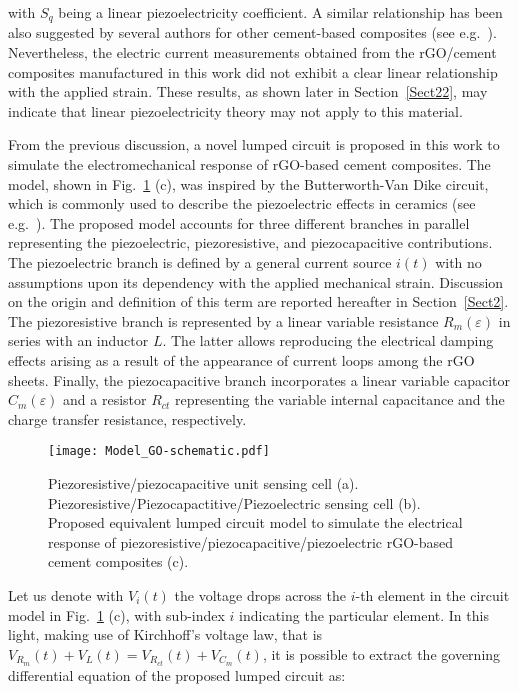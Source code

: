 \documentclass[a4paper,fleqn]{cas-sc}
\begin{document}
\noindent with $S_q$ being a linear piezoelectricity coefficient. A similar relationship has been also suggested by several authors for other cement-based composites (see e.g.~\cite{SHUAI2020108564}). Nevertheless, the electric current measurements obtained from the rGO/cement composites manufactured in this work did not exhibit a clear linear relationship with the applied strain. These results, as shown later in Section~\ref{Sect22}, may indicate that linear piezoelectricity theory may not apply to this material.

From the previous discussion, a novel lumped circuit is proposed in this work to simulate the electromechanical response of rGO-based cement composites. The model, shown in Fig.~\ref{lcm} (c), was inspired by the Butterworth-Van Dike circuit, which is commonly used to describe the piezoelectric effects in ceramics (see e.g.~\cite{Kim2008}). The proposed model accounts for three different branches in parallel representing the piezoelectric, piezoresistive, and piezocapacitive contributions. The piezoelectric branch is defined by a general current source $i(t)$ with no assumptions upon its dependency with the applied mechanical strain. Discussion on the origin and definition of this term are reported hereafter in Section~\ref{Sect2}. The piezoresistive branch is represented by a linear variable resistance $R_m(\varepsilon)$ in series with an inductor $L$. The latter allows reproducing the electrical damping effects arising as a result of the appearance of current loops among the rGO sheets. Finally, the piezocapacitive branch incorporates a linear variable capacitor $C_m(\varepsilon)$ and a resistor $R_{ct}$ representing the variable internal capacitance and the charge transfer resistance, respectively.  

\begin{figure}[ht]
    \centering
    \texttt{[image: Model\_GO-schematic.pdf]}
    \caption{Piezoresistive/piezocapacitive unit sensing cell (a). Piezoresistive/Piezocapactitive/Piezoelectric sensing cell (b). Proposed equivalent lumped circuit model to simulate the electrical response of piezoresistive/piezocapacitive/piezoelectric rGO-based cement composites (c).}
    \label{lcm}
\end{figure}

Let us denote with $V_i(t)$ the voltage drops across the $i$-th element in the circuit model in Fig.~\ref{lcm} (c), with sub-index $i$ indicating the particular element. In this light, making use of Kirchhoff's voltage law, that is $V_{R_m}(t) + V_{L}(t) = V_{R_{ct}}(t) + V_{C_m}(t)$, it is possible to extract the governing differential equation of the proposed lumped circuit as:
\end{document}
